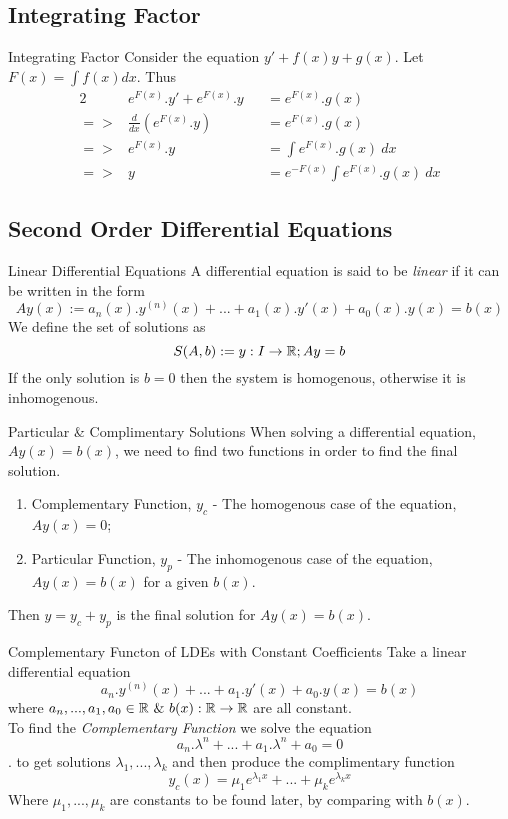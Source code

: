\documentclass[11pt,a4paper]{article}
\begin{document}
\subsection{Integrating Factor}
%
\subtitle{Theorem 6.04 - }{Integrating Factor}
Consider the equation $y' + f(x)y + g(x)$. Let $F(x) = \int{f(x)dx}$. Thus \begin{alignat*}{2}
  &e^{F(x)}.y' + e^{F(x)}.y &&= e^{F(x)}.g(x) \\
  => &\frac{d}{dx}\left(e^{F(x)}.y \right) &&= e^{F(x)}.g(x) \\
  => &e^{F(x)}.y &&= \int{e^{F(x)}.g(x)\ dx} \\
  => &y &&= e^{-F(x)} \int{e^{F(x)}.g(x)\ dx}
\end{alignat*}

\subsection{Second Order Differential Equations}
%
\subtitle{Definition 6.05 - }{Linear Differential Equations}
A differential equation is said to be \textit{linear} if it can be written in the form $$Ay(x) := a_n(x).y^{(n)}(x) + ... + a_1(x).y'(x) + a_0(x).y(x) = b(x)$$
We define the set of solutions as $$S(A, b) := {y : I \to \mathbb{R} ; Ay = b}$$
If the only solution is $b=0$ then the system is homogenous, otherwise it is inhomogenous. \\

\subtitle{Definition 6.06 - }{Particular \& Complimentary Solutions}
When solving a differential equation, $Ay(x) = b(x)$, we need to find two functions in order to find the final solution.
\begin{enumerate}[label=\roman*)]
  \item Complementary Function, $y_c$ - The homogenous case of the equation, $Ay(x) = 0$;
  \item Particular Function, $y_p$ - The inhomogenous case of the equation, $Ay(x) = b(x)$ for a given $b(x)$.
\end{enumerate}
Then $y = y_c + y_p$ is the final solution for $Ay(x) = b(x)$.

\newpage
\subtitle{Theorem 6.07 - }{Complementary Functon of LDEs with Constant Coefficients}
Take a linear differential equation $$a_n.y^{(n)}(x) + ... + a_1.y'(x) + a_0.y(x) = b(x)$$ where $a_n, ... , a_1, a_0 \in \real\ \mathrm{\&}\ b(x) : \real \to \real$ are all constant. \\
To find the \textit{Complementary Function} we solve the equation $$a_n.\lambda^n + ... + a_1.\lambda^n + a_0 = 0$$.
to get solutions $\lambda_1, ... , \lambda_k$ and then produce the complimentary function $$y_c(x) = \mu_1e^{\lambda_1x} + ... + \mu_ke^{\lambda_kx}$$
Where $\mu_1, ... , \mu_k$ are constants to be found later, by comparing with $b(x)$.
\end{document}
